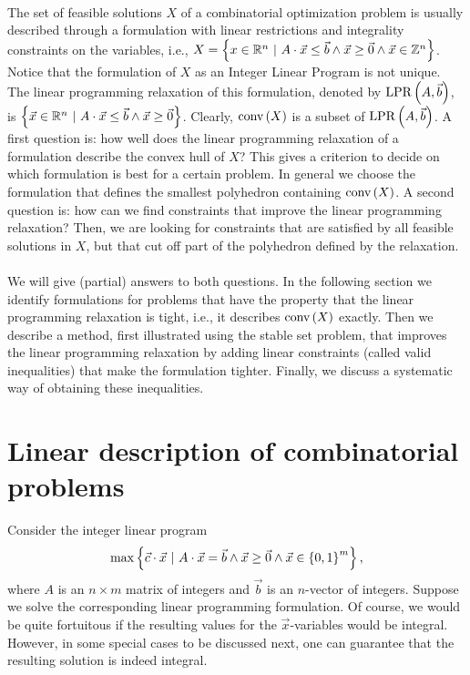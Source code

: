 \documentclass[titlepage]{book}
\theoremstyle{plain}
\theoremstyle{definition}
\theoremstyle{remark}
\begin{document}
\paragraph{}
The set of feasible solutions $X$ of a combinatorial optimization problem is usually described through a formulation with linear restrictions and integrality constraints on the variables, i.e., $X=\left\{ x\in\mathbb{R}^n\ |\ A\cdot\vec{x}\leq\vec{b}\wedge\vec{x}\geq\vec{0}\wedge\vec{x}\in\mathbb{Z}^n \right\}$. Notice that the formulation of $X$ as an Integer Linear Program is not unique. The linear programming relaxation of this formulation, denoted by $\mbox{LPR}\left( A,\vec{b} \right)$, is $\left\{ \vec{x}\in\mathbb{R}^n\ |\ A\cdot\vec{x}\leq\vec{b}\wedge\vec{x}\geq\vec{0} \right\}$. Clearly, $\mbox{conv}\left( X \right)$ is a subset of $\mbox{LPR}\left( A,\vec{b} \right)$. A first question is: how well does the linear programming relaxation of a formulation describe the convex hull of $X$? This gives a criterion to decide on which formulation is best for a certain problem. In general we choose the formulation that defines the smallest polyhedron containing $\mbox{conv}\left( X \right)$. A second question is: how can we find constraints that improve the linear programming relaxation? Then, we are looking for constraints that are satisfied by all feasible solutions in $X$, but that cut off part of the polyhedron defined by the relaxation.

\paragraph{}
We will give (partial) answers to both questions. In the following section we identify formulations for problems that have the property that the linear programming relaxation is tight, i.e., it describes $\mbox{conv}\left( X \right)$ exactly. Then we describe a method, first illustrated using the stable set problem, that improves the linear programming relaxation by adding linear constraints (called valid inequalities) that make the formulation tighter. Finally, we discuss a systematic way of obtaining these inequalities.

\section{Linear description of combinatorial problems}
Consider the integer linear program
\begin{equation}
\max\left\{ \vec{c}\cdot\vec{x}\ |\ A\cdot\vec{x}=\vec{b}\wedge\vec{x}\geq\vec{0}\wedge\vec{x}\in\left\{ 0,1 \right\}^m \right\},
\end{equation}
where $A$ is an $n\times m$ matrix of integers and $\vec{b}$ is an $n$-vector of integers. Suppose we solve the corresponding linear programming formulation. Of course, we would be quite fortuitous if the resulting values for the $\vec{x}$-variables would be integral. However, in some special cases to be discussed next, one can guarantee that the resulting solution is indeed integral.
\end{document}
